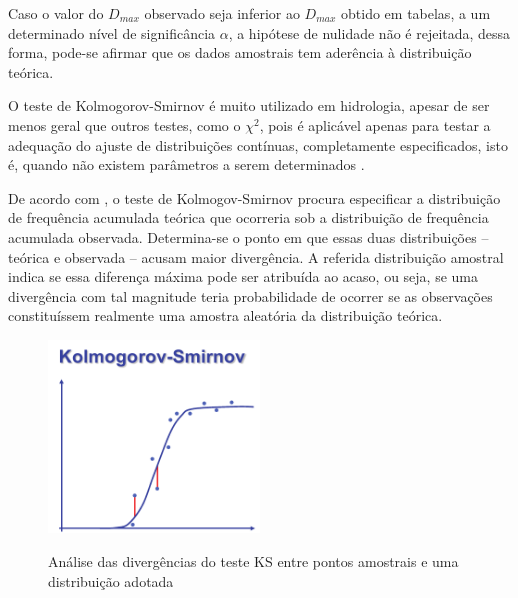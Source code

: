 Caso o valor do $D_{max}$ observado seja inferior ao $D_{max}$ obtido em tabelas, a um determinado nível de significância $\alpha$, a hipótese de nulidade não é rejeitada, dessa forma, pode-se afirmar que os dados amostrais tem aderência à distribuição teórica.

O teste de Kolmogorov-Smirnov é muito utilizado em hidrologia, apesar de ser menos geral que outros testes, como o $\chi^2$, pois é aplicável apenas para testar a adequação do ajuste de distribuições contínuas, completamente especificados, isto é, quando não existem parâmetros a serem determinados \cite{hidrologia-estatistica-np}.

De acordo com , o teste de Kolmogov-Smirnov procura especificar a distribuição de frequência acumulada teórica que ocorreria sob a distribuição de frequência acumulada observada. Determina-se o ponto em que essas duas distribuições – teórica e observada – acusam maior divergência. A referida distribuição amostral indica se essa diferença máxima pode ser atribuída ao acaso, ou seja, se uma divergência com tal magnitude teria probabilidade de ocorrer se as observações constituíssem realmente uma amostra aleatória da distribuição teórica. 

\begin{figure}[h]
    \caption{Análise das divergências do teste KS entre pontos amostrais e uma distribuição adotada}
    \centering
    \includegraphics[width=0.5\textwidth]{Textuais/Figuras/kolmogorov.pdf}
    \label{fig:kolmogorov}
\end{figure}